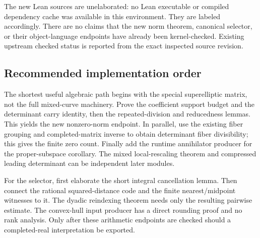 The new Lean sources are unelaborated: no Lean executable or compiled dependency cache was available in this environment. They are labeled accordingly. There are no claims that the new norm theorem, canonical selector, or their object-language endpoints have already been kernel-checked. Existing upstream checked status is reported from the exact inspected source revision.

\subsection{Recommended implementation order}

The shortest useful algebraic path begins with the special superelliptic matrix, not the full mixed-curve machinery. Prove the coefficient support budget and the determinant carry identity, then the repeated-division and reducedness lemmas. This yields the new nonzero-norm endpoint. In parallel, use the existing fiber grouping and completed-matrix inverse to obtain determinant fiber divisibility; this gives the finite zero count. Finally add the runtime annihilator producer for the proper-subspace corollary. The mixed local-rescaling theorem and compressed leading determinant can be independent later modules.

For the selector, first elaborate the short integral cancellation lemma. Then connect the rational squared-distance code and the finite nearest/midpoint witnesses to it. The dyadic reindexing theorem needs only the resulting pairwise estimate. The convex-hull input producer has a direct rounding proof and no rank analysis. Only after these arithmetic endpoints are checked should a completed-real interpretation be exported.
